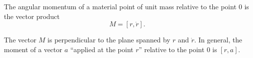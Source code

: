 The angular momentum of a material point of unit mass relative to the point $0$ is the vector product
$$M = [r, \dot{r}].$$

The vector $M$ is perpendicular to the plane spanned by $r$ and $\dot{r}$. In general, the moment of a vector $a$ ``applied at the point $r$'' relative to the point $0$ is $[r, a]$.
